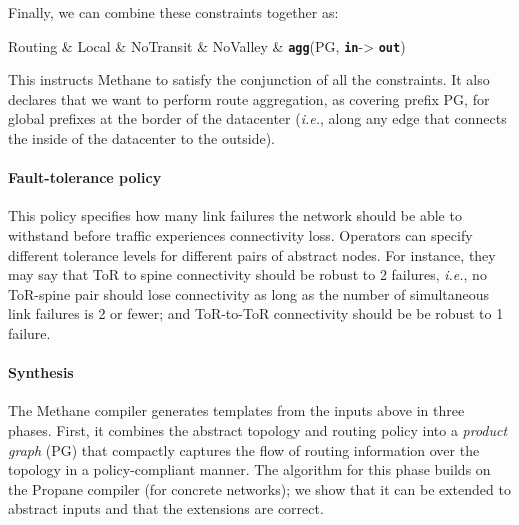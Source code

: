 \documentclass[numbers, 10pt, preprint]{sigplanconf}
\newcommand{\IE}{\emph{i.e.}}
\newcommand{\sysname}{{\small \sf Methane}\xspace}
\newcommand{\propane}{{\small \sf Propane}\xspace}
\newcommand{\para}[1]{\paragraph*{\textbf{#1}}}
\newcommand{\KW}[1]{\texttt{\small\bfseries{#1}}}
\newcommand{\Agg}{\KW{agg}}
\newcommand{\In}{\KW{in}}
\newcommand{\Out}{\KW{out}}
\begin{document}
Finally, we can combine these constraints together as:

\begin{code}
Routing & Local & NoTransit &
NoValley & \Agg(PG, \In -> \Out)
\end{code}
\noindent
This instructs \sysname to satisfy the conjunction of all the constraints. It also declares that we want to perform route aggregation, as covering prefix PG, for global prefixes at the border of the datacenter (\IE, along any edge that connects the inside of the datacenter to the outside).

\para{Fault-tolerance policy} This policy specifies how many link failures the network should be able to withstand before traffic experiences connectivity loss. Operators can specify different tolerance levels for different pairs of abstract nodes. For instance, they may say that ToR to spine connectivity should be robust to 2 failures, \IE, no ToR-spine pair should lose connectivity as long as the number of simultaneous link failures is 2 or fewer; and ToR-to-ToR connectivity should be be robust to 1 failure.

\para{Synthesis}


The \sysname compiler generates templates from the inputs above in three phases. First, it combines the abstract topology and routing policy into a {\em product graph} (PG) that compactly captures the flow of routing information over the topology in a policy-compliant manner. The algorithm for this phase builds on the \propane compiler (for concrete networks); we show that it can be extended to abstract inputs and that the extensions are correct.
\end{document}
